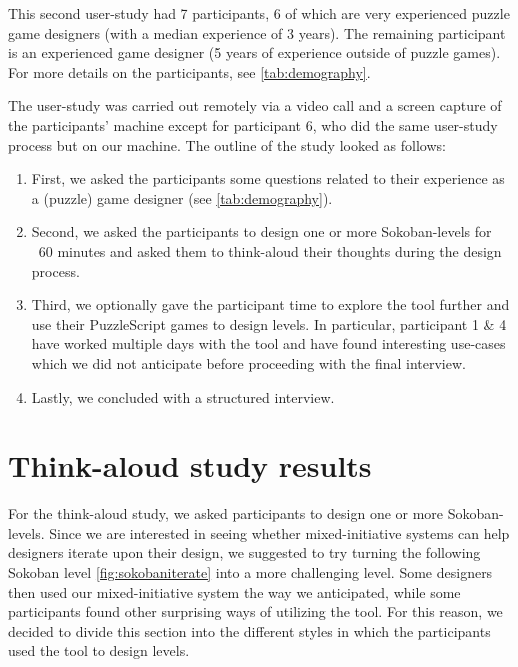 This second user-study had 7 participants, 6 of which are very experienced puzzle game designers (with a median experience of 3 years). The remaining participant is an experienced game designer (5 years of experience outside of puzzle games). For more details on the participants, see \ref{tab:demography}.

The user-study was carried out remotely via a video call and a screen capture of the participants' machine except for participant 6, who did the same user-study process but on our machine. The outline of the study looked as follows:

\begin{enumerate}
\item  First, we asked the participants some questions related to their experience as a (puzzle) game designer (see \ref{tab:demography}).
\item Second, we asked the participants to design one or more Sokoban-levels for ~60 minutes and asked them to think-aloud their thoughts during the design process.
\item Third, we optionally gave the participant time to explore the tool further and use their PuzzleScript games to design levels. In particular, participant 1 \& 4 have worked multiple days with the tool and have found interesting use-cases which we did not anticipate before proceeding with the final interview.
\item Lastly, we concluded with a structured interview.
\end{enumerate}


\section{Think-aloud study results}
For the think-aloud study, we asked participants to design one or more Sokoban-levels. 
Since we are interested in seeing whether mixed-initiative systems can help designers iterate upon their design, we suggested to try turning the following Sokoban level \ref{fig:sokobaniterate} into a more challenging level. Some designers then used our mixed-initiative system the way we anticipated, while some participants found other surprising ways of utilizing the tool. For this reason, we decided to divide this section into the different styles in which the participants used the tool to design levels.


